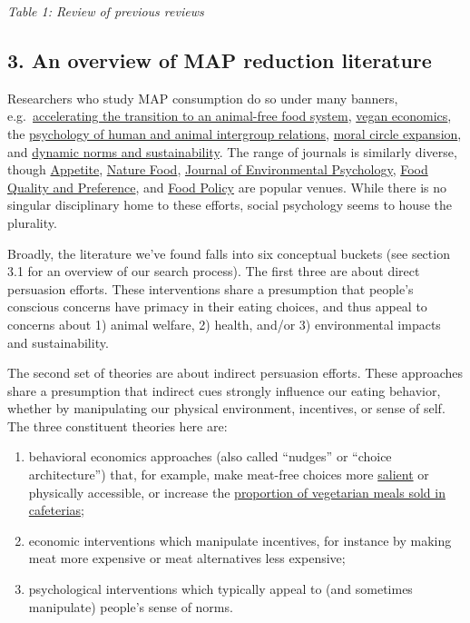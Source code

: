 \documentclass[
  letterpaper,
  DIV=11,
  numbers=noendperiod]{scrartcl}
\providecommand{\tightlist}{%
  \setlength{\itemsep}{0pt}\setlength{\parskip}{0pt}}\usepackage{longtable,booktabs,array}
\begin{document}
\emph{Table 1: Review of previous reviews}

\hypertarget{an-overview-of-map-reduction-literature}{%
\subsection{\texorpdfstring{\textbf{3. An overview of MAP reduction
literature}}{3. An overview of MAP reduction literature}}\label{an-overview-of-map-reduction-literature}}

Researchers who study MAP consumption do so under many banners,
e.g.~\href{https://www.foodlabstanford.com/}{accelerating the transition
to an animal-free food system},
\href{https://scholar.cgu.edu/joshua-tasoff/}{vegan economics}, the
\href{https://blogs.kent.ac.uk/shark/}{psychology of human and animal
intergroup relations}, \href{https://luciuscaviola.com/}{moral circle
expansion}, and \href{https://sisclab.bc.edu/research/}{dynamic norms
and sustainability}. The range of journals is similarly diverse, though
\href{https://www.sciencedirect.com/journal/appetite}{Appetite},
\href{https://www.nature.com/natfood/}{Nature Food},
\href{https://www.sciencedirect.com/journal/journal-of-environmental-psychology}{Journal
of Environmental Psychology},
\href{https://www.sciencedirect.com/journal/food-quality-and-preference}{Food
Quality and Preference}, and
\href{https://www.sciencedirect.com/journal/food-policy}{Food Policy}
are popular venues. While there is no singular disciplinary home to
these efforts, social psychology seems to house the plurality.

Broadly, the literature we've found falls into six conceptual buckets
(see section 3.1 for an overview of our search process). The first three
are about direct persuasion efforts. These interventions share a
presumption that people's conscious concerns have primacy in their
eating choices, and thus appeal to concerns about 1) animal welfare, 2)
health, and/or 3) environmental impacts and sustainability.

The second set of theories are about indirect persuasion efforts. These
approaches share a presumption that indirect cues strongly influence our
eating behavior, whether by manipulating our physical environment,
incentives, or sense of self. The three constituent theories here are:

\begin{enumerate}
\def\labelenumi{\arabic{enumi}.}
\tightlist
\item
  behavioral economics approaches (also called ``nudges'' or ``choice
  architecture'') that, for example, make meat-free choices more
  \href{https://www.nature.com/articles/s43016-020-0132-8}{salient} or
  physically accessible, or increase the
  \href{https://www.pnas.org/doi/full/10.1073/pnas.1907207116}{proportion
  of vegetarian meals sold in cafeterias};
\item
  economic interventions which manipulate incentives, for instance by
  making meat more expensive or meat alternatives less expensive;
\item
  psychological interventions which typically appeal to (and sometimes
  manipulate) people's sense of norms.
\end{enumerate}
\end{document}
